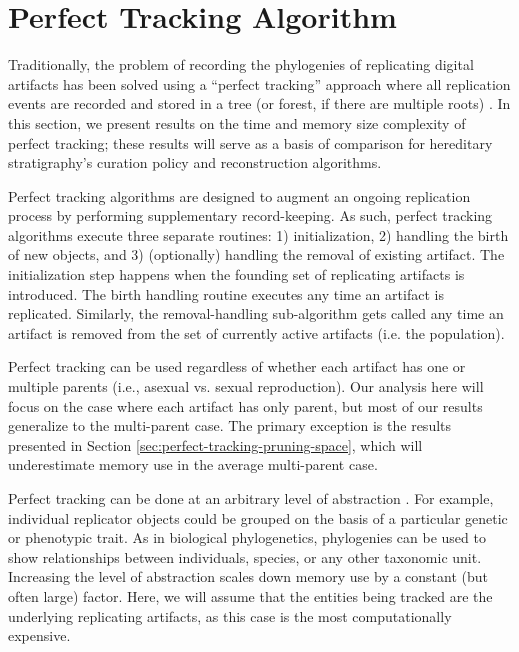 \section{Perfect Tracking Algorithm} \label{sec:perfect-tracking-algorithm}

Traditionally, the problem of recording the phylogenies of replicating digital
artifacts has been solved using a ``perfect tracking'' approach where all replication
events are recorded and stored in a tree (or forest, if there are multiple roots) \citep{dolson2023phylotrackpy}.
In this section, we present results on the time and memory size complexity of perfect tracking;
these results will serve as a basis of comparison for hereditary stratigraphy's curation policy and reconstruction algorithms.

Perfect tracking algorithms are designed to augment an ongoing replication process by performing supplementary record-keeping.
As such, perfect tracking algorithms execute three separate routines: 1) initialization, 2) handling the birth of new objects, and 3) (optionally) handling the removal of existing artifact.
The initialization step happens when the founding set of replicating artifacts is introduced.
The birth handling routine executes any time an artifact is replicated.
Similarly, the removal-handling sub-algorithm gets called any time an artifact is removed from the set of currently active artifacts (i.e. the population).

Perfect tracking can be used regardless of whether each artifact has one or multiple parents (i.e., asexual vs. sexual reproduction).
Our analysis here will focus on the case where each artifact has only parent, but most of our results generalize to the multi-parent case.
The primary exception is the results presented in Section \ref{sec:perfect-tracking-pruning-space}, which will underestimate memory use in the average multi-parent case.

Perfect tracking can be done at an arbitrary level of abstraction \citep{dolson2020interpreting, dolson2023phylotrackpy}.
For example, individual replicator objects could be grouped on the basis of a particular genetic or phenotypic trait.
As in biological phylogenetics, phylogenies can be used to show relationships between individuals, species, or any other taxonomic unit.
Increasing the level of abstraction scales down memory use by a constant (but often large) factor.
Here, we will assume that the entities being tracked are the underlying replicating artifacts, as this case is the most computationally expensive.

